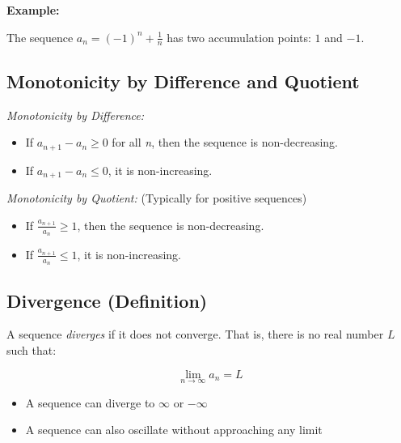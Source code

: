 \textbf{Example:}
\vspace{\baselineskip}
 
The sequence \(a_n = {(-1)}^n + \frac{1}{n}\) has two accumulation points: \(1\) and \(-1\).

\subsection{Monotonicity by Difference and Quotient}

\emph{Monotonicity by Difference:}

\begin{itemize}

    \item If \(a_{n+1} - a_n \ge 0\) for all \emph{n}, then the sequence is non-decreasing.


    \item If \(a_{n+1} - a_n \le 0\), it is non-increasing.

\end{itemize}

\emph{Monotonicity by Quotient:} (Typically for positive sequences)

\begin{itemize}

    \item If \(\frac{a_{n+1}}{a_n} \ge 1\), then the sequence is non-decreasing.


    \item If \(\frac{a_{n+1}}{a_n} \le 1\), it is non-increasing.

\end{itemize}

\subsection{Divergence (Definition)}

A sequence \emph{diverges} if it does not converge. That is, there is no real number \(L\) such that:

\[
    \lim_{n \to \infty} a_n = L
\]

\begin{itemize}

    \item A sequence can diverge to \(\infty\) or \(-\infty\)

    \item A sequence can also oscillate without approaching any limit

\end{itemize}


